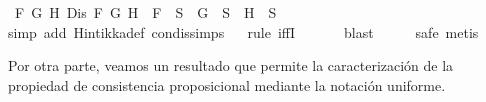 \begin{isabellebody}
{\isasymand}\ {\isacharparenleft}{\isasymforall}F\ G\ H{\isachardot}\ Dis\ F\ G\ H\ {\isasymlongrightarrow}\ F\ {\isasymin}\ S\ {\isasymlongrightarrow}\ G\ {\isasymin}\ S\ {\isasymor}\ H\ {\isasymin}\ S{\isacharparenright}{\isacharparenright}{\isachardoublequoteclose}\ \ \isanewline
%
\isadelimproof
\ \ %
\endisadelimproof
%
\isatagproof
{}\isamarkupfalse%
{\isacharparenleft}simp\ add{\isacharcolon}\ Hintikka{\isacharunderscore}def\ con{\isacharunderscore}dis{\isacharunderscore}simps{\isacharparenright}\isanewline
\ \ \isamarkupfalse%
{\isacharparenleft}rule\ iffI{\isacharparenright}\isanewline
\ \ \ \isamarkupfalse%
\ \isamarkupfalse%
\ blast\isanewline
\ \ \isamarkupfalse%
\ \isamarkupfalse%
\ safe\ metis{\isacharplus}\isanewline
\ \ \isamarkupfalse%
%
\endisatagproof
{\isafoldproof}%
%
\isadelimproof
%
\endisadelimproof
%
\begin{isamarkuptext}%
Por otra parte, veamos un resultado que permite la caracterización de la 
  propiedad de consistencia proposicional mediante la notación uniforme.


\end{isamarkuptext}
\end{isabellebody}
